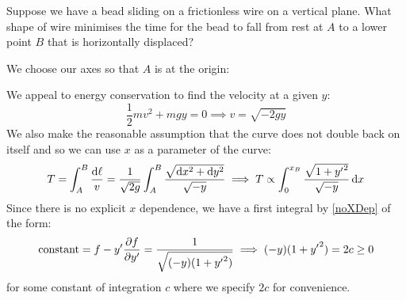 \documentclass[../main.tex]{subfiles}
\begin{document}
\begin{example} \label{exBrachistochrone}
  Suppose we have a bead sliding on a frictionless wire on a vertical plane.
  What shape of wire minimises the time for the bead to fall from rest at $A$ to a lower point $B$ that is horizontally displaced?

  We choose our axes so that $A$ is at the origin:
  \begin{center}
  \end{center}
  We appeal to energy conservation to find the velocity at a given $y$:
  \[
    \frac{1}{2} mv^2 + mgy = 0 \implies v = \sqrt{-2gy}
  \]
  We also make the reasonable assumption that the curve does not double back on itself and so we can use $x$ as a parameter of the curve:
  \[
    T = \int_{A}^{B} \frac{\d{\ell}}{v} = \frac{1}{\sqrt{2g}} \int_{A}^{B} \frac{\sqrt{\d{x}^2 + \d{y}^2}}{\sqrt{-y}} \implies T \propto \int_{0}^{x_B} \frac{\sqrt{1 + {y'}^2}}{\sqrt{-y}} \d{x}
  \]
  Since there is no explicit $x$ dependence, we have a first integral by \cref{noXDep} of the form:
  \[
    \text{constant} = f - y' \pderiv{f}{y'} = \frac{1}{\sqrt{(-y)(1 + {y'}^2)}} \implies (-y)(1 + {y'}^2) = 2c \geq0
  \]
  for some constant of integration $c$ where we specify $2c$ for convenience.


\end{example}
\end{document}
